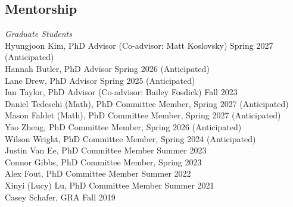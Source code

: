\documentclass[margin,line]{res}
\begin{document}
\begin{resume}
% 

\section{\sc Mentorship}

{\em Graduate Students} \hfill \\
Hyungjoon Kim, PhD Advisor (Co-advisor: Matt Koslovsky) \hfill Spring 2027 (Anticipated) \\
Hannah Butler, PhD Advisor \hfill Spring 2026 (Anticipated) \\
Lane Drew, PhD Advisor \hfill Spring 2025 (Anticipated) \\
Ian Taylor, PhD Advisor (Co-advisor: Bailey Fosdick) \hfill Fall 2023 \\
Daniel Tedeschi (Math), PhD Committee Member, \hfill Spring 2027 (Anticipated) \\
Mason Faldet (Math), PhD Committee Member, \hfill Spring 2027 (Anticipated) \\
Yao Zheng, PhD Committee Member, \hfill Spring 2026 (Anticipated) \\ 
Wilson Wright, PhD Committee Member, \hfill Spring 2024 (Anticipated) \\
Justin Van Ee, PhD Committee Member \hfill Summer 2023 \\
Connor Gibbs, PhD Committee Member, \hfill Spring 2023  \\
Alex Fout, PhD Committee Member \hfill Summer 2022 \\
Xinyi (Lucy) Lu, PhD Committee Member \hfill Summer 2021 \\
Casey Schafer, GRA \hfill Fall 2019 \\




\end{resume}
\end{document}

